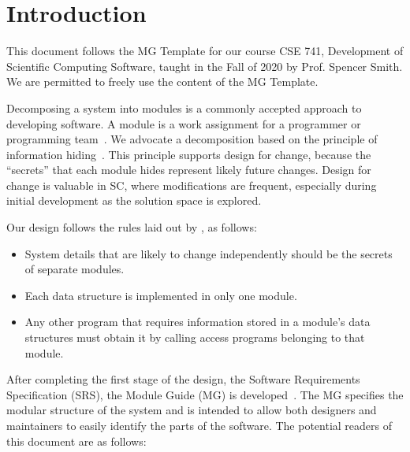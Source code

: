 \documentclass[12pt, titlepage]{article}
\begin{document}
\newpage

\tableofcontents

\listoftables

\listoffigures

\newpage


\section{Introduction}

This document follows the MG Template for our course CSE 741, Development
of Scientific Computing Software, taught in the Fall of 2020 by Prof. Spencer Smith.
We are permitted to freely use the content of the MG Template.

Decomposing a system into modules is a commonly accepted approach to developing
software.  A module is a work assignment for a programmer or programming
team~\citep{ParnasEtAl1984}.  We advocate a decomposition
based on the principle of information hiding~\citep{Parnas1972a}.  This
principle supports design for change, because the ``secrets'' that each module
hides represent likely future changes.  Design for change is valuable in SC,
where modifications are frequent, especially during initial development as the
solution space is explored.  

Our design follows the rules laid out by \citet{ParnasEtAl1984}, as follows:
\begin{itemize}
\item System details that are likely to change independently should be the
  secrets of separate modules.
\item Each data structure is implemented in only one module.
\item Any other program that requires information stored in a module's data
  structures must obtain it by calling access programs belonging to that module.
\end{itemize}

After completing the first stage of the design, the Software Requirements
Specification (SRS), the Module Guide (MG) is developed~\citep{ParnasEtAl1984}. The MG
specifies the modular structure of the system and is intended to allow both
designers and maintainers to easily identify the parts of the software.  The
potential readers of this document are as follows:
\end{document}
